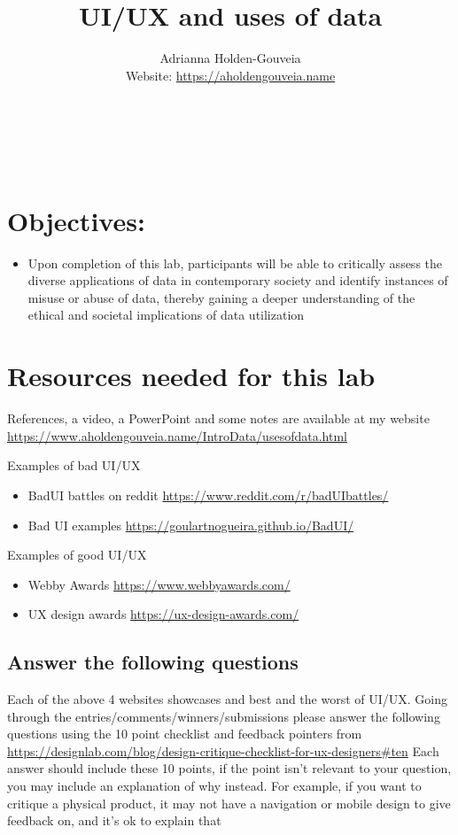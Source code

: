 \documentclass[12pt]{article}
\title{UI/UX and uses of data}
\author{
        Adrianna Holden-Gouveia \\
        Website: \url{https://aholdengouveia.name}\\ 
        \date{\vspace{-5ex}}
        \faLinkedin{: aholdengouveia} \\
        \faGithub {: aholdengouveia} \\
        \faTwitter {: aholdengouveia} \\
        }
\begin{document}
    

\maketitle


\section*{Objectives:}
\begin{itemize}
    \item Upon completion of this lab, participants will be able to critically assess the diverse applications of data in contemporary society and identify instances of misuse or abuse of data, thereby gaining a deeper understanding of the ethical and societal implications of data utilization
\end{itemize}


\section*{Resources needed for this lab}

References, a video, a PowerPoint and some notes are available at my website
\url {https://www.aholdengouveia.name/IntroData/usesofdata.html}

Examples of bad UI/UX
\begin{itemize}
    \item BadUI battles on reddit \url{https://www.reddit.com/r/badUIbattles/}
    \item Bad UI examples \url{https://goulartnogueira.github.io/BadUI/}
\end{itemize}    

Examples of good UI/UX
\begin{itemize}
    \item Webby Awards \url{https://www.webbyawards.com/}
    \item UX design awards \url{https://ux-design-awards.com/}
\end{itemize}


\subsection*{Answer the following questions}
Each of the above 4 websites showcases and best and the worst of UI/UX. Going through the entries/comments/winners/submissions please answer the following questions using the 10 point checklist and feedback pointers from \url{https://designlab.com/blog/design-critique-checklist-for-ux-designers#ten} Each answer should include these 10 points, if the point isn't relevant to your question, you may include an explanation of why instead. For example, if you want to critique a physical product, it may not have a navigation or mobile design to give feedback on, and it's ok to explain that
\end{document}
